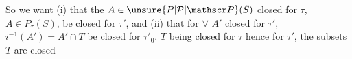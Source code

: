 So we want (i) that the $A\in\unsure{P|\mathcal P|\mathscr P}(S)$ closed for $\tau$,  $A\in P_\tau(S)$, be closed for $\tau'$,  and (ii) that for \uline{$\forall$} $A'$ closed for $\tau'$, $i^{-1}(A')=A'\cap T$ be closed for $\tau'_0$.  $T$ being closed  for $\tau$ hence for $\tau'$, the  subsets   $T$  are closed

